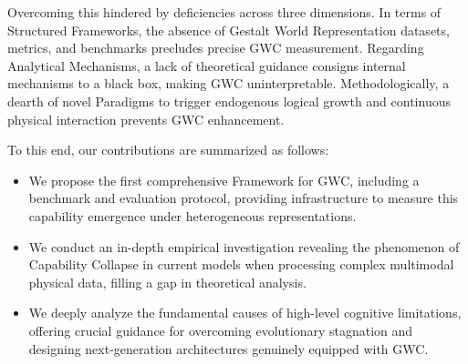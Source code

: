 Overcoming this hindered by deficiencies across three dimensions. In terms of Structured Frameworks, the absence of Gestalt World Representation datasets, metrics, and benchmarks precludes precise GWC measurement. Regarding Analytical Mechanisms, a lack of theoretical guidance consigns internal mechanisms to a black box, making GWC uninterpretable. Methodologically, a dearth of novel Paradigms to trigger endogenous logical growth and continuous physical interaction prevents GWC enhancement.

To this end, our contributions are summarized as follows: 
\begin{itemize} 
	\item{}We propose the first comprehensive Framework for GWC, including a benchmark and evaluation protocol, providing infrastructure to measure this capability emergence under heterogeneous representations. 
	\item{}We conduct an in-depth empirical investigation revealing the phenomenon of Capability Collapse in current models when processing complex multimodal physical data, filling a gap in theoretical analysis. 
	\item{}We deeply analyze the fundamental causes of high-level cognitive limitations, offering crucial guidance for overcoming evolutionary stagnation and designing next-generation architectures genuinely equipped with GWC.
\end{itemize}

